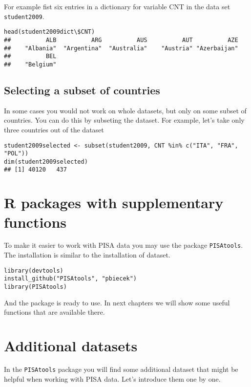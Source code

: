 For example fist six entries in a dictionary for variable CNT in the data set \verb:student2009:.
\begin{shaded}\begin{verbatim}
head(student2009dict\$CNT)
##          ALB          ARG          AUS          AUT          AZE 
##    "Albania"  "Argentina"  "Australia"    "Austria" "Azerbaijan" 
##          BEL 
##    "Belgium"
\end{verbatim}\end{shaded}

\subsection{Selecting a subset of countries}
In some cases you would not work on whole datasets, but only on some subset of countries. You can do this by subseting the dataset. For example, let's take only three countries out of the dataset

\begin{shaded}\begin{verbatim}
student2009selected <- subset(student2009, CNT %in% c("ITA", "FRA", "POL"))
dim(student2009selected)
## [1] 40120   437
\end{verbatim}\end{shaded}


\section{R packages with supplementary functions}
To make it easier to work with PISA data you may use the package \verb:PISAtools:. The installation is similar to the installation of dataset.

\begin{shaded}\begin{verbatim}
library(devtools)
install_github("PISAtools", "pbiecek")
library(PISAtools)
\end{verbatim}\end{shaded}

And the package is ready to use.
In next chapters we will show some useful functions that are available there.

\section{Additional datasets}

In the \verb:PISAtools: package you will find some additional dataset that might be helpful when working with PISA data. Let's introduce them one by one.

